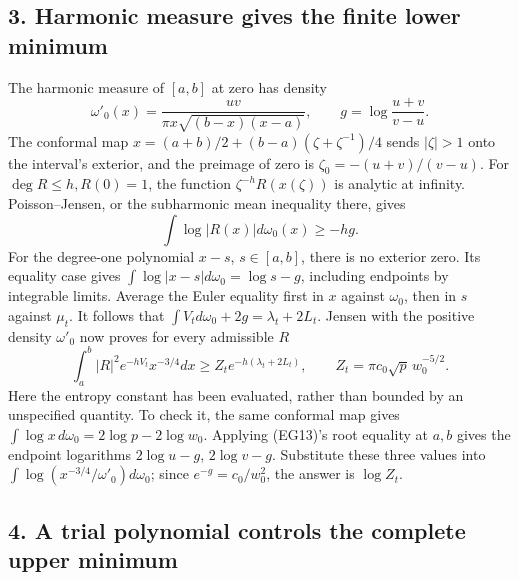 \documentclass[10pt]{article}
\begin{document}
\subsection{3. Harmonic measure gives the finite lower minimum}\label{harmonic-measure-gives-the-finite-lower-minimum}

The harmonic measure of \([a,b]\) at zero has density \[
 \omega'_0(x)=\frac{uv}{\pi x\sqrt{(b-x)(x-a)}},
 \qquad g=\log\frac{u+v}{v-u}.
\] The conformal map \(x=(a+b)/2+(b-a)(\zeta+\zeta^{-1})/4\) sends \(|\zeta|>1\) onto the interval's exterior, and the preimage of zero is \(\zeta_0=-(u+v)/(v-u)\). For \(\deg R\le h,R(0)=1\), the function \(\zeta^{-h}R(x(\zeta))\) is analytic at infinity. Poisson--Jensen, or the subharmonic mean inequality there, gives \[
 \int\log|R(x)|d\omega_0(x)\ge-hg.
 \tag{EG13}
\] For the degree-one polynomial \(x-s\), \(s\in[a,b]\), there is no exterior zero. Its equality case gives \(\int\log|x-s|d\omega_0=\log s-g\), including endpoints by integrable limits. Average the Euler equality first in \(x\) against \(\omega_0\), then in \(s\) against \(\mu_t\). It follows that \(\int V_t d\omega_0+2g=\lambda_t+2L_t\). Jensen with the positive density \(\omega'_0\) now proves for every admissible \(R\) \[
 \int_a^b|R|^2e^{-hV_t}x^{-3/4}dx
 \ge Z_t e^{-h(\lambda_t+2L_t)},\qquad
 Z_t=\pi c_0\sqrt p\,w_0^{-5/2}.
 \tag{EG14}
\] Here the entropy constant has been evaluated, rather than bounded by an unspecified quantity. To check it, the same conformal map gives \(\int\log x\,d\omega_0=2\log p-2\log w_0\). Applying (EG13)'s root equality at \(a,b\) gives the endpoint logarithms \(2\log u-g\), \(2\log v-g\). Substitute these three values into \(\int\log(x^{-3/4}/\omega'_0)d\omega_0\); since \(e^{-g}=c_0/w_0^2\), the answer is \(\log Z_t\).

\subsection{4. A trial polynomial controls the complete upper minimum}\label{a-trial-polynomial-controls-the-complete-upper-minimum}
\end{document}
